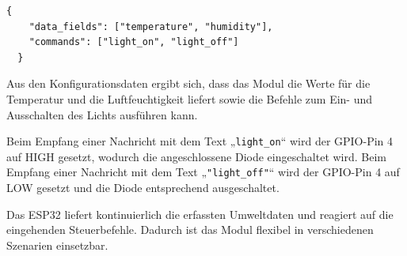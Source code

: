 \documentclass[12pt, letterpaper]{article}
\begin{document}
\begin{Verbatim}[frame=single]
  {
    "data_fields": ["temperature", "humidity"],
    "commands": ["light_on", "light_off"]
  }
\end{Verbatim}
\par Aus den Konfigurationsdaten ergibt sich, dass das Modul die Werte für die Temperatur und die Luftfeuchtigkeit liefert sowie die Befehle zum Ein- und Ausschalten des Lichts ausführen kann.
\par Beim Empfang einer Nachricht mit dem Text „\texttt{light\_on}“ wird der GPIO-Pin 4 auf HIGH gesetzt, wodurch die angeschlossene Diode eingeschaltet wird. Beim Empfang einer Nachricht mit dem Text „\texttt{"light\_off"}“ wird der GPIO-Pin 4 auf LOW gesetzt und die Diode entsprechend ausgeschaltet.
\par Das ESP32 liefert kontinuierlich die erfassten Umweltdaten und reagiert auf die eingehenden Steuerbefehle. Dadurch ist das Modul flexibel in verschiedenen Szenarien einsetzbar.
\newpage
\end{document}
